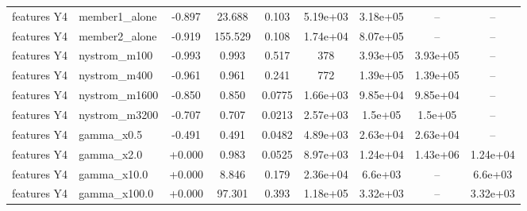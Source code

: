 \begin{tabular}{llccccccc}
features Y4 & member1\_alone & -0.897 & 23.688 & 0.103 & 5.19e+03 & 3.18e+05 & -- & -- \\
features Y4 & member2\_alone & -0.919 & 155.529 & 0.108 & 1.74e+04 & 8.07e+05 & -- & -- \\
features Y4 & nystrom\_m100 & -0.993 & 0.993 & 0.517 & 378 & 3.93e+05 & 3.93e+05 & -- \\
features Y4 & nystrom\_m400 & -0.961 & 0.961 & 0.241 & 772 & 1.39e+05 & 1.39e+05 & -- \\
features Y4 & nystrom\_m1600 & -0.850 & 0.850 & 0.0775 & 1.66e+03 & 9.85e+04 & 9.85e+04 & -- \\
features Y4 & nystrom\_m3200 & -0.707 & 0.707 & 0.0213 & 2.57e+03 & 1.5e+05 & 1.5e+05 & -- \\
features Y4 & gamma\_x0.5 & -0.491 & 0.491 & 0.0482 & 4.89e+03 & 2.63e+04 & 2.63e+04 & -- \\
features Y4 & gamma\_x2.0 & +0.000 & 0.983 & 0.0525 & 8.97e+03 & 1.24e+04 & 1.43e+06 & 1.24e+04 \\
features Y4 & gamma\_x10.0 & +0.000 & 8.846 & 0.179 & 2.36e+04 & 6.6e+03 & -- & 6.6e+03 \\
features Y4 & gamma\_x100.0 & +0.000 & 97.301 & 0.393 & 1.18e+05 & 3.32e+03 & -- & 3.32e+03 \\
\bottomrule
\end{tabular}
